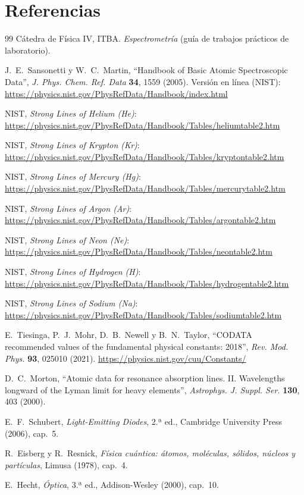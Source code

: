 \documentclass{article}
\begin{document}
\section{Referencias}
\begingroup
\renewcommand{\section}[2]{}
\begin{thebibliography}{99}
 Cátedra de Física IV, ITBA. \emph{Espectrometría} (guía de trabajos prácticos de laboratorio).

 J.~E.~Sansonetti y W.~C.~Martin, ``Handbook of Basic Atomic Spectroscopic Data'', \emph{J. Phys. Chem. Ref. Data} \textbf{34}, 1559 (2005). Versión en línea (NIST): \url{https://physics.nist.gov/PhysRefData/Handbook/index.html}

 NIST, \emph{Strong Lines of Helium (He)}: \url{https://physics.nist.gov/PhysRefData/Handbook/Tables/heliumtable2.htm}

 NIST, \emph{Strong Lines of Krypton (Kr)}: \url{https://physics.nist.gov/PhysRefData/Handbook/Tables/kryptontable2.htm}

 NIST, \emph{Strong Lines of Mercury (Hg)}: \url{https://physics.nist.gov/PhysRefData/Handbook/Tables/mercurytable2.htm}

 NIST, \emph{Strong Lines of Argon (Ar)}: \url{https://physics.nist.gov/PhysRefData/Handbook/Tables/argontable2.htm}

 NIST, \emph{Strong Lines of Neon (Ne)}: \url{https://physics.nist.gov/PhysRefData/Handbook/Tables/neontable2.htm}

 NIST, \emph{Strong Lines of Hydrogen (H)}: \url{https://physics.nist.gov/PhysRefData/Handbook/Tables/hydrogentable2.htm}

 NIST, \emph{Strong Lines of Sodium (Na)}: \url{https://physics.nist.gov/PhysRefData/Handbook/Tables/sodiumtable2.htm}

 E.~Tiesinga, P.~J.~Mohr, D.~B.~Newell y B.~N.~Taylor, ``CODATA recommended values of the fundamental physical constants: 2018'', \emph{Rev. Mod. Phys.} \textbf{93}, 025010 (2021). \url{https://physics.nist.gov/cuu/Constants/}

 D.~C.~Morton, ``Atomic data for resonance absorption lines. II. Wavelengths longward of the Lyman limit for heavy elements'', \emph{Astrophys. J. Suppl. Ser.} \textbf{130}, 403 (2000).

 E.~F.~Schubert, \emph{Light-Emitting Diodes}, 2.ª ed., Cambridge University Press (2006), cap.~5.

 R.~Eisberg y R.~Resnick, \emph{Física cuántica: átomos, moléculas, sólidos, núcleos y partículas}, Limusa (1978), cap.~4.

 E.~Hecht, \emph{Óptica}, 3.ª ed., Addison-Wesley (2000), cap.~10.
\end{thebibliography}
\endgroup
\end{document}
